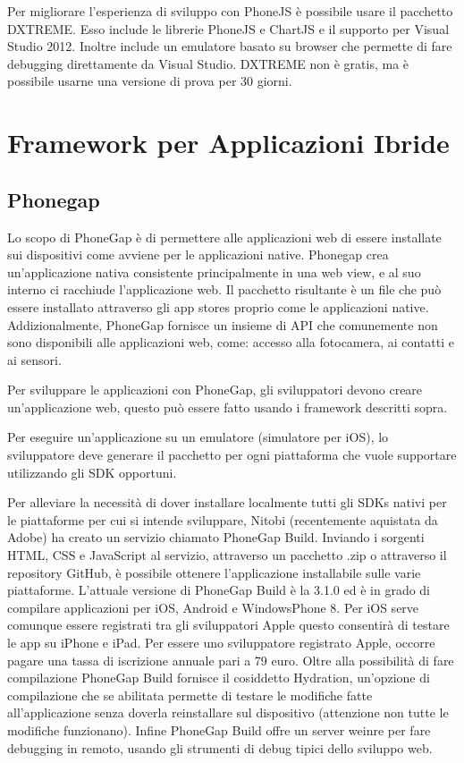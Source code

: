 			Per migliorare l'esperienza di sviluppo con PhoneJS è possibile usare 
			il pacchetto DXTREME. Esso include le librerie PhoneJS e ChartJS e il 
			supporto per Visual Studio 2012. Inoltre include un emulatore basato 
			su browser che permette di fare debugging direttamente da Visual Studio.
			DXTREME non è gratis, ma è possibile usarne una versione di prova per 
			30 giorni.
			
	\section{Framework per Applicazioni Ibride}
	\label{sec:frameworkhybrid}
		\subsection{Phonegap}
			Lo scopo di PhoneGap è di permettere alle applicazioni web di essere 
			installate sui dispositivi come avviene per le applicazioni native. 
			Phonegap crea un'applicazione nativa consistente principalmente in 
			una web view, e al suo interno ci racchiude l'applicazione web. Il pacchetto 
			risultante è un file che può essere installato attraverso gli app stores
			proprio come le applicazioni native.
			Addizionalmente, PhoneGap fornisce un insieme di API che comunemente non 
			sono disponibili alle applicazioni web, come: accesso alla fotocamera, 
			ai contatti e ai sensori.
			
			Per sviluppare le applicazioni con PhoneGap, gli sviluppatori devono 
			creare un'applicazione web, questo può essere fatto usando i framework 
			descritti sopra.  
			
			Per eseguire un'applicazione su un emulatore (simulatore per iOS), 
			lo sviluppatore deve generare il pacchetto per ogni piattaforma che 
			vuole supportare utilizzando gli SDK opportuni.
			
			Per alleviare la necessità di dover installare localmente 
			tutti gli SDKs nativi 
			per le piattaforme per cui si intende sviluppare, Nitobi (recentemente 
			aquistata da Adobe) ha creato un servizio chiamato PhoneGap Build. 
			Inviando i sorgenti HTML, CSS e JavaScript al servizio, attraverso un 
			pacchetto .zip o attraverso il repository GitHub, è possibile ottenere 
			l'applicazione installabile sulle varie piattaforme.
			L'attuale versione di PhoneGap Build è la 3.1.0 ed è in grado di compilare 
			applicazioni per iOS, Android e WindowsPhone 8. Per iOS serve comunque 
			essere registrati tra gli sviluppatori Apple questo consentirà di 
			testare le app su iPhone e iPad. Per essere uno sviluppatore 
			registrato Apple, occorre pagare una tassa di iscrizione annuale 
			pari a 79 euro.
			Oltre alla possibilità di fare compilazione PhoneGap Build fornisce 
			il cosiddetto Hydration, un'opzione di compilazione che se abilitata 
			permette di testare le modifiche fatte all'applicazione senza doverla 
			reinstallare sul dispositivo (attenzione non tutte le modifiche 
			funzionano). Infine PhoneGap Build offre un server weinre per fare 
			debugging in remoto, usando gli strumenti di debug tipici dello 
			sviluppo web.
			 
